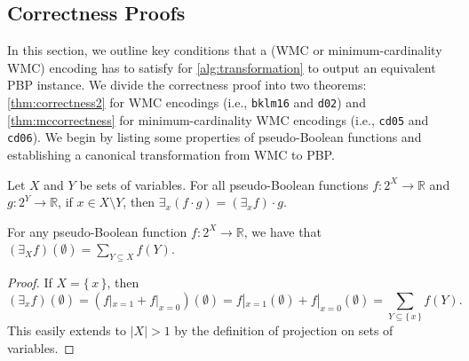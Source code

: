\subsection{Correctness Proofs}\label{sec:proof}

In this section, we outline key conditions that a (WMC or minimum-cardinality
WMC) encoding has to satisfy for \cref{alg:transformation} to output an
equivalent PBP instance. We divide the correctness proof into two theorems:
\cref{thm:correctness2} for WMC encodings (i.e., \texttt{bklm16} and
\texttt{d02}) and \cref{thm:mccorrectness} for minimum-cardinality WMC encodings
(i.e., \texttt{cd05} and \texttt{cd06}). We begin by listing some properties of
pseudo-Boolean functions and establishing a canonical transformation from WMC to
PBP\@.

\begin{theorem}\label{thm:early}
  Let $X$ and $Y$ be sets of variables. For all pseudo-Boolean functions
  $f\colon 2^X \to \mathbb{R}$ and $g\colon 2^Y \to \mathbb{R}$, if $x \in X
  \setminus Y$, then $\exists_x (f \cdot g) = (\exists_x f) \cdot g$.
\end{theorem}

\begin{lemma} \label{lemma:sum}
  For any pseudo-Boolean function $f\colon 2^X \to \mathbb{R}$, we have that
  $(\exists_X f)(\emptyset) = \sum_{Y \subseteq X} f(Y)$.
\end{lemma}
\begin{proof}
  If $X = \{\, x \,\}$, then
  \[
    (\exists_{x}f)(\emptyset) = (f|_{x=1} + f|_{x=0})(\emptyset) = f|_{x=1}(\emptyset) + f|_{x=0}(\emptyset) = \sum_{Y \subseteq \{\, x \,\}} f(Y).
  \]
  This easily extends to $|X| > 1$ by the definition of projection on sets of
  variables.
\end{proof}

